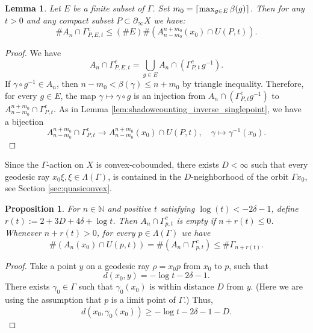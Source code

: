 \documentclass[12pt]{amsbook}%
\newtheorem{lem}[thm]{Lemma}
\newtheorem{prop}[thm]{Proposition}
\theoremstyle{definition}
\theoremstyle{remark}
\numberwithin{section}{chapter}
\numberwithin{subsection}{section}
\numberwithin{figure}{chapter}
\def\Uupt{U(P,t)}
\def\Ga{\Gamma}
\def\ga{\gamma}
\def\La{\Lambda}
\def\geo{\partial_\infty}
\DeclarePairedDelimiter\ceil{\lceil}{\rceil}
\begin{document}
{{\begin{lem}\label{lem:shadowcounting_inverse}
Let $E$ be a finite subset of $\Gamma$. Set $m_0=\ceil{\max_{g\in E}\beta(g)}$. %
Then for any $t>0$ and any compact subset $P\subset \geo X$ we have:
\[
\# A_n \cap \Gamma_{P,E,t}^c \leqslant (\#E)\# \left(A_{n-m_0}^{n+m_0}(x_0) \cap \Uupt\right).
\]
\end{lem}
\begin{proof}
We have  
\[
A_n\cap\Gamma_{P,E,t}^c=\bigcup_{g\in E}A_n\cap \left(\Gamma_{P,t}^c \, g^{-1}\right).
\] 
If $\gamma\circ g^{-1}\in A_n$, then $n-m_0<\beta(\gamma)\leqslant n+m_0$ by triangle inequality. Therefore, for every $g\in E$, 
the map $\gamma\mapsto \gamma\circ g$ is an injection from $A_n\cap \left(\Gamma_{P,t}^cg^{-1}\right)$ to $A_{n-m_0}^{n+m_0}\cap \Gamma_{P,t}^c$.
As in Lemma \ref{lem:shadowcounting_inverse_singlepoint}, we have a bijection
\[
A_{n-m_0}^{n+m_0}\cap \Gamma_{P,t}^c 
\rightarrow A_{n-m_0}^{n+m_0}(x_0) \cap \Uupt, \quad \gamma\mapsto \gamma^{-1}(x_0).
\]
\end{proof}


Since the $\Ga$-action on $X$ is convex-cobounded, there exists $D<\infty$ such that every geodesic ray $x_0\xi, \xi\in \La(\Ga)$, is contained in the $D$-neighborhood of the orbit $\Ga x_0$, see Section \ref{sec:quasiconvex}. 

\begin{prop} \label{prop_shadow_counting} 
For $n\in \mathbb N$ and positive $t$ satisfying $\log(t) < -2\delta -1$, define $r(t):=  2 + 3D+  4\delta + \log t$. 
Then $A_n \cap \Gamma_{p,t}^c$ is empty if $n+r(t)\leqslant 0$. Whenever $n+r(t)>0$, for every $p\in \La(\Ga)$ 
we have  
\begin{equation*}
\# (A_n(x_0) \cap U(p,t) )=\# (A_n \cap \Gamma_{p,t}^c ) \leqslant \# \Gamma_{n+r(t)}.
\end{equation*}
\end{prop} 


\begin{proof}

Take a point $y$ on a geodesic ray $\rho=x_0p$ from $x_0$ to $p$, such that 
$$d(x_0, y)= - \log t -2\delta - 1.$$ 
There exists  $\gamma_0 \in \Gamma$ such that $\gamma_0(x_0)$ is within distance $D$ from $y$. (Here we are using the assumption that $p$ is a limit point of $\Ga$.) Thus,
\begin{equation}\label{eq:yx_0}
d(x_0, \ga_0(x_0))\geqslant - \log t -2\delta -1 - D. 
\end{equation}


\end{proof}}}
\end{document}
